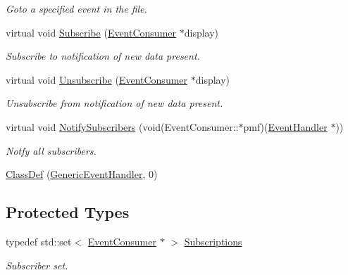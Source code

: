 \begin{DoxyCompactItemize}
\begin{DoxyCompactList}\small\item\em Goto a specified event in the file. \end{DoxyCompactList}\item 
virtual void \hyperlink{class_d_d4hep_1_1_generic_event_handler_a8065b0b0f095783b7daf38ff19660cf7}{Subscribe} (\hyperlink{class_d_d4hep_1_1_event_consumer}{Event\+Consumer} $\ast$display)
\begin{DoxyCompactList}\small\item\em Subscribe to notification of new data present. \end{DoxyCompactList}\item 
virtual void \hyperlink{class_d_d4hep_1_1_generic_event_handler_a030cffac2446e410dba9dec87802e035}{Unsubscribe} (\hyperlink{class_d_d4hep_1_1_event_consumer}{Event\+Consumer} $\ast$display)
\begin{DoxyCompactList}\small\item\em Unsubscribe from notification of new data present. \end{DoxyCompactList}\item 
virtual void \hyperlink{class_d_d4hep_1_1_generic_event_handler_a01e7a0bdb965b93d5a3b0ba8f9ccb85e}{Notify\+Subscribers} (void(Event\+Consumer\+::$\ast$pmf)(\hyperlink{class_d_d4hep_1_1_event_handler}{Event\+Handler} $\ast$))
\begin{DoxyCompactList}\small\item\em Notfy all subscribers. \end{DoxyCompactList}\item 
\hyperlink{class_d_d4hep_1_1_generic_event_handler_abbb82b5fc62720e45ed6c2ff03ae526d}{Class\+Def} (\hyperlink{class_d_d4hep_1_1_generic_event_handler}{Generic\+Event\+Handler}, 0)
\end{DoxyCompactItemize}
\subsection*{Protected Types}
\begin{DoxyCompactItemize}
\item 
typedef std\+::set$<$ \hyperlink{class_d_d4hep_1_1_event_consumer}{Event\+Consumer} $\ast$ $>$ \hyperlink{class_d_d4hep_1_1_generic_event_handler_a4b7fd1ba9fc0adab2fa1885162e69076}{Subscriptions}
\begin{DoxyCompactList}\small\item\em Subscriber set. \end{DoxyCompactList}\end{DoxyCompactItemize}
